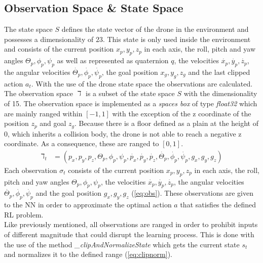 \subsection{Observation Space \& State Space}
The state space $S$ defines the state vector of the drone in the environment and possesses a dimensionality of $23$. 
This state is only used inside the environment and consists of the current position $x_p, y_p, z_p$ in each axis,
 the roll, pitch and yaw angles $\Theta_p, \phi_p, \psi_p$ as well as represented as quaternion $q$, 
 the velocities $\dot{x_p}, \dot{y_p}, \dot{z_p}$, the angular velocities $\dot{\Theta_p}, \dot{\phi_p}, \dot{\psi_p}$, 
 the goal position $x_g, y_g, z_g$ and the last clipped action $a_t$. With the use of the drone state space the observations are calculated.\\
\newline
The observation space $\daleth$ is a subset of the state space $S$ with the dimensionality of 15. 
The observation space is implemented as a \emph{spaces box} of type \emph{float32} which are mainly ranged within $[-1, 1]$ 
with the exception of the z coordinate of the position $z_p$ and goal $z_g$. 
Because there is a floor defined as a plain at the height of $0$, which inherits a collision body, 
the drone is not able to reach a negative z coordinate. As a consequence, these are ranged to $[0,1]$.
\newline
\begin{align}
	\daleth_t &= (p_x,p_y,p_z, \Theta_p, \phi_p, \psi_p, \dot{p_x}, \dot{p_y}, \dot{p_z}, \dot{\Theta_p}, \dot{\phi_p}, \dot{\psi_p}, g_x, g_y, g_z) \label{eq:obs}
\end{align}
\newline
Each observation $\sigma_t$ consists of the current position $x_p, y_p, z_p$ in each axis, 
the roll, pitch and yaw angles $\Theta_p, \phi_p, \psi_p$, the velocities $\dot{x_p}, \dot{y_p}, \dot{z_p}$, 
the angular velocities $\dot{\Theta_p}, \dot{\phi_p}, \dot{\psi_p}$ and the goal position $g_x, g_y, g_z$ (\cref{eq:obs}). 
These observations are given to the NN in order to approximate the optimal action $a$ that satisfies the defined RL problem.\\
\newline
Like previously mentioned, all observations are ranged in order to prohibit inputs of different magnitude that could disrupt the learning process. 
This is done with the use of the method \emph{\_clipAndNormalizeState} which gets the current state $s_t$ and normalizes it to the defined range (\cref{eq:clipnorm}). 
